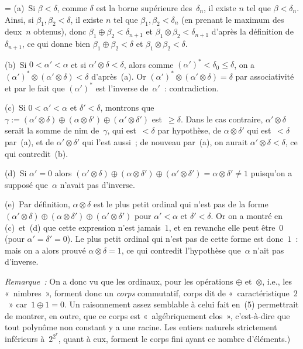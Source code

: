 \documentclass[12pt,a4paper]{article}
\theoremstyle{definition}
\newif\ifcorrige
\newenvironment{corrige}%
{\ifcorrige\relax\else\setbox0=\vbox\bgroup\fi%
\smallbreak\noindent{\underbar{\textit{Corrigé.}}\quad}}
{{\hbox{}\nobreak\hfill\checkmark}%
\ifcorrige\relax\else\egroup\fi\par}
\begin{document}
\begin{corrige}
(a) Si $\beta < \delta$, comme $\delta$ est la borne supérieure
  des $\delta_n$, il existe $n$ tel que $\beta < \delta_n$.  Ainsi, si
  $\beta_1,\beta_2 < \delta$, il existe $n$ tel que $\beta_1,\beta_2 <
  \delta_n$ (en prenant le maximum des deux $n$ obtenus), donc
  $\beta_1\oplus\beta_2 < \delta_{n+1}$ et $\beta_1\otimes\beta_2 <
  \delta_{n+1}$ d'après la définition de $\delta_{n+1}$, ce qui donne
  bien $\beta_1\oplus\beta_2 < \delta$ et $\beta_1\otimes\beta_2 <
  \delta$.

(b) Si $0 < \alpha' < \alpha$ et si $\alpha' \otimes \delta < \delta$,
  alors comme $(\alpha')^* < \delta_0 \leq \delta$, on a
  $(\alpha')^*\otimes (\alpha' \otimes \delta) < \delta$ d'après (a).
  Or $(\alpha')^* \otimes (\alpha' \otimes \delta) = \delta$ par
  associativité et par le fait que $(\alpha')^*$ est l'inverse
  de $\alpha'$ : contradiction.

(c) Si $0 < \alpha' < \alpha$ et $\delta' < \delta$, montrons que
  $\gamma := (\alpha'\otimes\delta) \oplus (\alpha\otimes\delta')
  \oplus (\alpha'\otimes\delta')$ est $\geq\delta$.  Dans le cas
  contraire, $\alpha'\otimes\delta$ serait la somme de nim
  de $\gamma$, qui est $<\delta$ par hypothèse, de
  $\alpha\otimes\delta'$ qui est $<\delta$ par (a), et de
  $\alpha'\otimes\delta'$ qui l'est aussi ; de nouveau par (a), on
  aurait $\alpha'\otimes\delta < \delta$, ce qui contredit (b).

(d) Si $\alpha'=0$ alors $(\alpha'\otimes\delta) \oplus
  (\alpha\otimes\delta') \oplus (\alpha'\otimes\delta') =
  \alpha\otimes\delta' \neq 1$ puisqu'on a supposé que $\alpha$
  n'avait pas d'inverse.

(e) Par définition, $\alpha\otimes\delta$ est le plus petit ordinal
  qui n'est pas de la forme $(\alpha'\otimes\delta) \oplus
  (\alpha\otimes\delta') \oplus (\alpha'\otimes\delta')$ pour
  $\alpha'<\alpha$ et $\delta'<\delta$.  Or
  on a montré en (c) et (d) que cette expression n'est jamais $1$, et
  en revanche elle peut être $0$ (pour $\alpha'=\delta'=0$).  Le plus
  petit ordinal qui n'est pas de cette forme est donc $1$ : mais on a
  alors prouvé $\alpha\otimes\delta = 1$, ce qui contredit l'hypothèse
  que $\alpha$ n'ait pas d'inverse.
\end{corrige}

\smallbreak

{\footnotesize
\emph{Remarque :} On a donc vu que les ordinaux, pour les opérations
$\oplus$ et $\otimes$, i.e., les « nimbres », forment donc un
\emph{corps} commutatif, corps dit de « caractéristique $2$ »
car $1\oplus 1 = 0$.  Un raisonnement assez semblable à celui fait
en (5) permettrait de montrer, en outre, que ce corps est
« algébriquement clos », c'est-à-dire que tout polynôme non constant y
a une racine.  Les entiers naturels strictement inférieurs
à $2^{2^r}$, quant à eux, forment le corps fini ayant ce nombre
d'éléments.)
\par}
\end{document}
